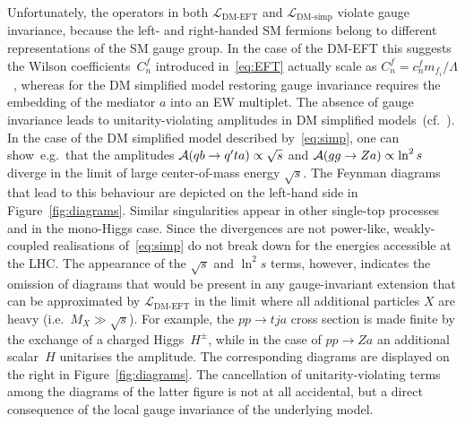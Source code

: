 \documentclass[a4paper, 11pt,notoc]{article}
\begin{document}
Unfortunately, the operators in both $\mathcal{L}_\text{DM-EFT}$ and $\mathcal{L}_\text{DM-simp}$ violate gauge invariance, because the left- and right-handed SM fermions belong to different representations of the SM gauge group. In the case of the DM-EFT this suggests the Wilson coefficients~$C_n^f$ introduced in~\eqref{eq:EFT} actually scale as $C_n^f = c_n^f m_{f_i}/\Lambda$~\cite{Bell:2015sza}, whereas for the DM simplified model restoring gauge invariance requires the embedding of the mediator $a$ into an EW multiplet. The absence of gauge invariance leads to unitarity-violating amplitudes in DM simplified models~(cf.~\cite{Bell:2015sza,Bell:2015rdw,Haisch:2016usn,Englert:2016joy,Maltoni:2001hu,Farina:2012xp}). In the case of the DM simplified model described by~\eqref{eq:simp}, one can show~e.g.~that the amplitudes ${\cal A} ( q b \to q^\prime t a) \propto \sqrt{s}$ and ${\cal A} ( g g \to Z a ) \propto \ln^2 s$ diverge in the limit of large center-of-mass energy $\sqrt{s}$. The Feynman diagrams that lead to this behaviour are depicted on the left-hand side in Figure~\ref{fig:diagrams}. Similar singularities appear in other single-top processes and in the mono-Higgs case.  Since the divergences are not power-like, weakly-coupled realisations of~\eqref{eq:simp} do not break down for the energies accessible at the LHC. The appearance of the $\sqrt{s}$ and $\ln^2 s$ terms, however, indicates the omission of diagrams that would be present in any gauge-invariant extension that can be approximated by $\mathcal{L}_\text{DM-EFT}$ in the limit where all additional particles $X$ are heavy (i.e.~$M_X \gg \sqrt{s}$).   For example, the $pp \to tj a$ cross section is made finite by the exchange of a charged Higgs~$H^\pm$, while in the case of $pp \to Za$  an additional scalar~$H$ unitarises the amplitude. The corresponding diagrams are displayed on the right in Figure~\ref{fig:diagrams}. The cancellation of unitarity-violating terms among the diagrams of the latter figure is not at all accidental, but a direct consequence of the local gauge invariance of the underlying model.
\end{document}
